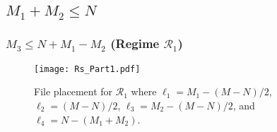 \documentclass[conference]{IEEEtran}
\begin{document}
%
%


\subsection{$M_1+M_2\leq N$}


\subsubsection{$M_3\leq N+M_1-M_2$ (Regime $\mathcal{R}_1$)}

\begin{figure}[!t] \centering %
\texttt{[image: Rs\_Part1.pdf]}\vspace{-0.2in}
\caption{File placement for ${\mathcal R}_1$ where ${\ell}_1=M_1-(M-N)/2$, ${\ell}_2=(M-N)/2$, ${\ell}_3=M_2-(M-N)/2$, and ${\ell}_4=N-(M_1+M_2)$.}\label{caseR1}\vspace{-0.1in}
\end{figure}
\end{document}
